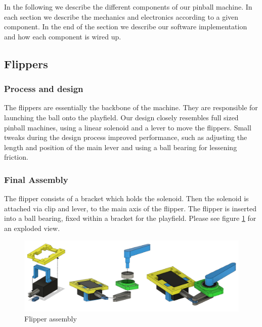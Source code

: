 In the following we describe the different components of our pinball machine. In each section we describe the mechanics and electronics according to a given component. In the end of the section we describe our software implementation and how each component is wired up. 

\subsection{Flippers}
\subsubsection{Process and design}
The flippers are essentially the backbone of the machine. They are responsible for launching the ball onto the playfield. Our design closely resembles full sized pinball machines, using a linear solenoid and a lever to move the flippers.
Small tweaks during the design process improved performance, such as adjusting the length and position of the main lever and using a ball bearing for lessening friction.
\subsubsection{Final Assembly}
The flipper consists of a bracket which holds the solenoid. Then the solenoid is attached via clip and lever, to the main axis of the flipper. The flipper is inserted into a ball bearing, fixed within a bracket for the playfield. Please see figure \ref{fig:flipperassembly} for an exploded view.
\begin{figure}
	\centering
	\includegraphics[width=\textwidth]{img/FlipperAssembly}
	\caption{Flipper assembly}
	\label{fig:flipperassembly}
\end{figure}

